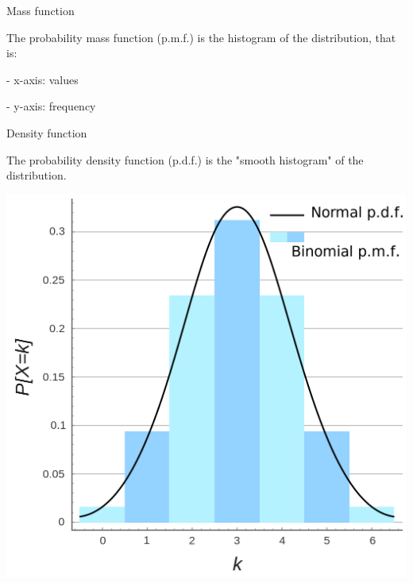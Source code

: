 Mass function

The probability mass function (p.m.f.) is the histogram of the distribution, that is:

- x-axis: values

- y-axis: frequency

\vspace{5mm}

Density function

The probability density function (p.d.f.) is the "smooth histogram" of the distribution.

\vspace{5mm}

\begin{center}
\includegraphics[scale=0.15]{mass_density_functions.png}
\end{center}

\vspace{5mm}